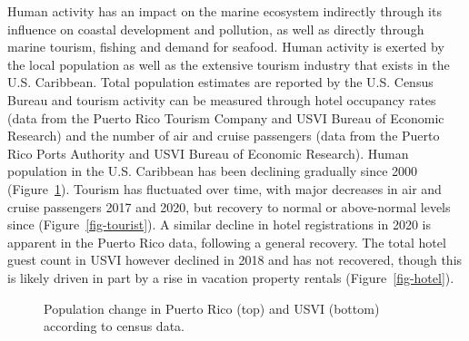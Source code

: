\documentclass[
  letterpaper,
  oneside,
  open=any]{scrbook}
\begin{document}
Human activity has an impact on the marine ecosystem indirectly through
its influence on coastal development and pollution, as well as directly
through marine tourism, fishing and demand for seafood. Human activity
is exerted by the local population as well as the extensive tourism
industry that exists in the U.S. Caribbean. Total population estimates
are reported by the U.S. Census Bureau and tourism activity can be
measured through hotel occupancy rates (data from the Puerto Rico
Tourism Company and USVI Bureau of Economic Research) and the number of
air and cruise passengers (data from the Puerto Rico Ports Authority and
USVI Bureau of Economic Research). Human population in the U.S.
Caribbean has been declining gradually since 2000
(Figure~\ref{fig-pop}). Tourism has fluctuated over time, with major
decreases in air and cruise passengers 2017 and 2020, but recovery to
normal or above-normal levels since (Figure~\ref{fig-tourist}). A
similar decline in hotel registrations in 2020 is apparent in the Puerto
Rico data, following a general recovery. The total hotel guest count in
USVI however declined in 2018 and has not recovered, though this is
likely driven in part by a rise in vacation property rentals
(Figure~\ref{fig-hotel}).

\begin{figure}


\caption{\label{fig-pop}Population change in Puerto Rico (top) and USVI
(bottom) according to census data.}

\end{figure}%
\end{document}
